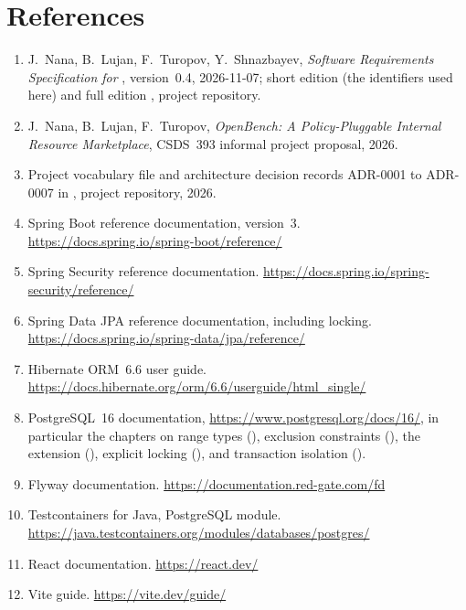 \section{References}\label{sec:refs}

{\sloppy
\begin{enumerate}
  \item J.~Nana, B.~Lujan, F.~Turopov, Y.~Shnazbayev, \emph{Software Requirements Specification for \SRSproduct{}}, version~0.4, 2026-11-07; short edition  (the identifiers used here) and full edition , project repository.
  \item J.~Nana, B.~Lujan, F.~Turopov, \emph{OpenBench: A Policy-Pluggable Internal Resource Marketplace}, CSDS~393 informal project proposal, 2026.
  \item Project vocabulary file  and architecture decision records ADR-0001 to ADR-0007 in , project repository, 2026.
  \item Spring Boot reference documentation, version~3. \url{https://docs.spring.io/spring-boot/reference/}
  \item Spring Security reference documentation. \url{https://docs.spring.io/spring-security/reference/}
  \item Spring Data JPA reference documentation, including locking. \url{https://docs.spring.io/spring-data/jpa/reference/}
  \item Hibernate ORM~6.6 user guide. \url{https://docs.hibernate.org/orm/6.6/userguide/html_single/}
  \item PostgreSQL~16 documentation, \url{https://www.postgresql.org/docs/16/}, in particular the chapters on range types (), exclusion constraints (), the  extension (), explicit locking (), and transaction isolation ().
  \item Flyway documentation. \url{https://documentation.red-gate.com/fd}
  \item Testcontainers for Java, PostgreSQL module. \url{https://java.testcontainers.org/modules/databases/postgres/}
  \item React documentation. \url{https://react.dev/}
  \item Vite guide. \url{https://vite.dev/guide/}

\end{enumerate}}
